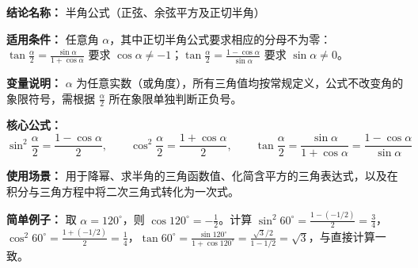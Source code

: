 \textbf{结论名称：} 半角公式（正弦、余弦平方及正切半角）

\textbf{适用条件：} 任意角 $\alpha$，其中正切半角公式要求相应的分母不为零：$\tan\frac{\alpha}{2} = \frac{\sin\alpha}{1+\cos\alpha}$ 要求 $\cos\alpha \neq -1$；$\tan\frac{\alpha}{2} = \frac{1-\cos\alpha}{\sin\alpha}$ 要求 $\sin\alpha \neq 0$。

\textbf{变量说明：} $\alpha$ 为任意实数（或角度），所有三角值均按常规定义，公式不改变角的象限符号，需根据 $\frac{\alpha}{2}$ 所在象限单独判断正负号。

\textbf{核心公式：}
\[
\boxed{\sin^2\frac{\alpha}{2} = \frac{1-\cos\alpha}{2},\qquad \cos^2\frac{\alpha}{2} = \frac{1+\cos\alpha}{2},\qquad \tan\frac{\alpha}{2} = \frac{\sin\alpha}{1+\cos\alpha} = \frac{1-\cos\alpha}{\sin\alpha}}
\]

\textbf{使用场景：} 用于降幂、求半角的三角函数值、化简含平方的三角表达式，以及在积分与三角方程中将二次三角式转化为一次式。

\textbf{简单例子：} 取 $\alpha = 120^\circ$，则 $\cos120^\circ = -\frac12$。计算 $\sin^2 60^\circ = \frac{1-(-1/2)}{2} = \frac{3}{4}$，$\cos^2 60^\circ = \frac{1+(-1/2)}{2} = \frac{1}{4}$，$\tan 60^\circ = \frac{\sin120^\circ}{1+\cos120^\circ} = \frac{\sqrt3/2}{1-1/2} = \sqrt3$，与直接计算一致。
